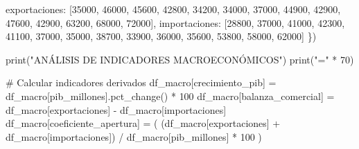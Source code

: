 \documentclass[
  doc,
  floatsintext,
  longtable,
  a4paper,
  nolmodern,
  notxfonts,
  notimes,
  12pt,
  colorlinks=true,linkcolor=blue,citecolor=blue,urlcolor=blue]{apa7}
\newenvironment{Shaded}{\begin{snugshade}}{\end{snugshade}}
\newcommand{\BuiltInTok}[1]{\textcolor[rgb]{0.00,0.23,0.31}{#1}}
\newcommand{\CommentTok}[1]{\textcolor[rgb]{0.37,0.37,0.37}{#1}}
\newcommand{\DecValTok}[1]{\textcolor[rgb]{0.68,0.00,0.00}{#1}}
\newcommand{\NormalTok}[1]{\textcolor[rgb]{0.00,0.23,0.31}{#1}}
\newcommand{\OperatorTok}[1]{\textcolor[rgb]{0.37,0.37,0.37}{#1}}
\newcommand{\StringTok}[1]{\textcolor[rgb]{0.13,0.47,0.30}{#1}}
\begin{document}
\begin{Shaded}
\begin{Highlighting}[]
    \StringTok{\textquotesingle{}exportaciones\textquotesingle{}}\NormalTok{: [}\DecValTok{35000}\NormalTok{, }\DecValTok{46000}\NormalTok{, }\DecValTok{45600}\NormalTok{, }\DecValTok{42800}\NormalTok{, }\DecValTok{34200}\NormalTok{, }\DecValTok{34000}\NormalTok{, }
                      \DecValTok{37000}\NormalTok{, }\DecValTok{44900}\NormalTok{, }\DecValTok{42900}\NormalTok{, }\DecValTok{47600}\NormalTok{, }\DecValTok{42900}\NormalTok{, }\DecValTok{63200}\NormalTok{, }
                      \DecValTok{68000}\NormalTok{, }\DecValTok{72000}\NormalTok{],}
    \StringTok{\textquotesingle{}importaciones\textquotesingle{}}\NormalTok{: [}\DecValTok{28800}\NormalTok{, }\DecValTok{37000}\NormalTok{, }\DecValTok{41000}\NormalTok{, }\DecValTok{42300}\NormalTok{, }\DecValTok{41100}\NormalTok{, }\DecValTok{37000}\NormalTok{, }
                      \DecValTok{35000}\NormalTok{, }\DecValTok{38700}\NormalTok{, }\DecValTok{33900}\NormalTok{, }\DecValTok{36000}\NormalTok{, }\DecValTok{35600}\NormalTok{, }\DecValTok{53800}\NormalTok{, }
                      \DecValTok{58000}\NormalTok{, }\DecValTok{62000}\NormalTok{]}
\NormalTok{\})}

\BuiltInTok{print}\NormalTok{(}\StringTok{"ANÁLISIS DE INDICADORES MACROECONÓMICOS"}\NormalTok{)}
\BuiltInTok{print}\NormalTok{(}\StringTok{"="} \OperatorTok{*} \DecValTok{70}\NormalTok{)}

\CommentTok{\# Calcular indicadores derivados}
\NormalTok{df\_macro[}\StringTok{\textquotesingle{}crecimiento\_pib\textquotesingle{}}\NormalTok{] }\OperatorTok{=}\NormalTok{ df\_macro[}\StringTok{\textquotesingle{}pib\_millones\textquotesingle{}}\NormalTok{].pct\_change() }\OperatorTok{*} \DecValTok{100}
\NormalTok{df\_macro[}\StringTok{\textquotesingle{}balanza\_comercial\textquotesingle{}}\NormalTok{] }\OperatorTok{=}\NormalTok{ df\_macro[}\StringTok{\textquotesingle{}exportaciones\textquotesingle{}}\NormalTok{] }\OperatorTok{{-}}\NormalTok{ df\_macro[}\StringTok{\textquotesingle{}importaciones\textquotesingle{}}\NormalTok{]}
\NormalTok{df\_macro[}\StringTok{\textquotesingle{}coeficiente\_apertura\textquotesingle{}}\NormalTok{] }\OperatorTok{=}\NormalTok{ (}
\NormalTok{    (df\_macro[}\StringTok{\textquotesingle{}exportaciones\textquotesingle{}}\NormalTok{] }\OperatorTok{+}\NormalTok{ df\_macro[}\StringTok{\textquotesingle{}importaciones\textquotesingle{}}\NormalTok{]) }\OperatorTok{/} 
\NormalTok{    df\_macro[}\StringTok{\textquotesingle{}pib\_millones\textquotesingle{}}\NormalTok{] }\OperatorTok{*} \DecValTok{100}
\NormalTok{)}


\end{Highlighting}
\end{Shaded}
\end{document}
